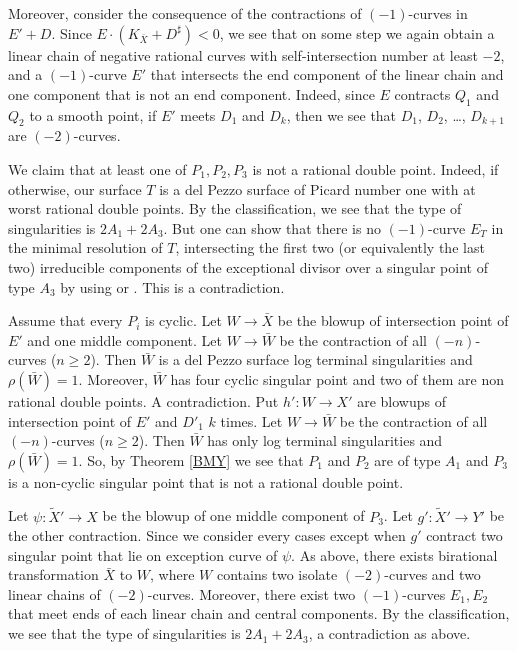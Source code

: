 \documentclass[10pt,oneside,reqno]{amsart}
\theoremstyle{definition}
\theoremstyle{remark}
\numberwithin{equation}{section}
\begin{document}
Moreover, consider the consequence of the contractions of $(-1)$-curves in $E'+D$. Since $E\cdot(K_{\bar{X}}+D^{\sharp})<0$, we see that on some step we again obtain a linear chain of negative rational curves with self-intersection number at least $-2$, and a $(-1)$-curve $E'$ that intersects the end component of the linear chain and one  component that is not an end component. Indeed, since $E$ contracts $Q_1$ and $Q_2$ to a smooth point, if $E'$ meets $D_1$ and $D_k$, then we see that $D_1$, $D_2$, \ldots, $D_{k+1}$ are $(-2)$-curves.

We claim that  at least one of $P_1,P_2,P_3$ is not a rational double point. Indeed, if otherwise, our surface $T$ is a del Pezzo surface of Picard number one with at worst rational double points. By the classification, we see that the type of singularities is $2A_1+2A_3$. But one can show that there is no $(-1)$-curve $E_T$ in the minimal resolution of $T$, intersecting the first two (or equivalently the last two) irreducible components of the exceptional divisor over a singular point of type $A_3$ by using \cite[Proposition 4.2]{Hw13} or \cite[Theorem 1]{Hw19}. This is a contradiction.


Assume that every $P_i$ is cyclic. Let $W\rightarrow\bar{X}$ be the blowup of intersection point of $E'$ and one middle component.
Let $W\rightarrow\bar{W}$ be the contraction of all $(-n)$-curves ($n\geq 2$). Then $\bar{W}$ is a del Pezzo surface log terminal singularities and $\rho(\bar{W})=1$. Moreover, $\bar{W}$ has four cyclic singular point and two of them are non rational double points. A contradiction. Put $h'\colon W\rightarrow X'$ are blowups of intersection point of $E'$ and $D'_1$ $k$ times. Let $W\rightarrow\bar{W}$ be the contraction of all $(-n)$-curves ($n\geq 2$). Then $\bar{W}$ has only log terminal singularities and $\rho(\bar{W})=1$. So, by Theorem \ref{BMY} we see that $P_1$ and $P_2$ are of type $A_1$ and $P_3$ is a non-cyclic singular point that is not a rational double point.


Let $\psi\colon\tilde{X}'\rightarrow X$ be the blowup of one middle  component of $P_3$. Let $g'\colon\tilde{X}'\rightarrow Y'$ be the other contraction. Since we consider every cases except when $g'$ contract two singular point that lie on exception curve of $\psi$. As above, there exists birational transformation $\bar{X}$ to $W$, where $W$ contains two isolate $(-2)$-curves and two linear chains of $(-2)$-curves. Moreover, there exist two $(-1)$-curves $E_1,E_2$ that meet ends of each linear chain and central components. By the classification, we see that the type of singularities is $2A_1+2A_3$, a contradiction as above.
\end{document}
